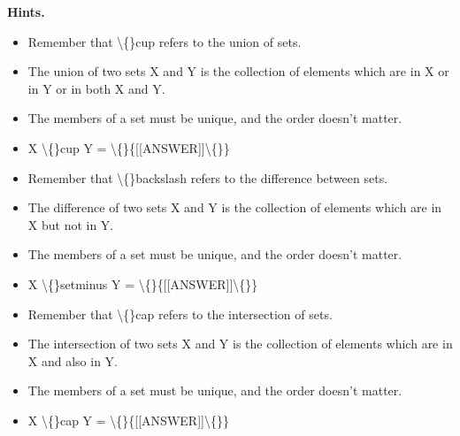 \documentclass{article}
\begin{document}
\textbf{Hints.}
\begin{itemize}
  \item Remember that \textbackslash\{\}cup refers to the union of sets.
  \item The union of two sets X and Y is the collection of elements which are in X or in Y or in both X and Y.
  \item The members of a set must be unique, and the order doesn't matter.
  \item X \textbackslash\{\}cup Y = \textbackslash\{\}\{[[ANSWER]]\textbackslash\{\}\}
  \item Remember that \textbackslash\{\}backslash refers to the difference between sets.
  \item The difference of two sets X and Y is the collection of elements which are in X but not in Y.
  \item The members of a set must be unique, and the order doesn't matter.
  \item X \textbackslash\{\}setminus Y = \textbackslash\{\}\{[[ANSWER]]\textbackslash\{\}\}
  \item Remember that \textbackslash\{\}cap refers to the intersection of sets.
  \item The intersection of two sets X and Y is the collection of elements which are in X and also in Y.
  \item The members of a set must be unique, and the order doesn't matter.
  \item X \textbackslash\{\}cap Y = \textbackslash\{\}\{[[ANSWER]]\textbackslash\{\}\}
\end{itemize}
\end{document}
